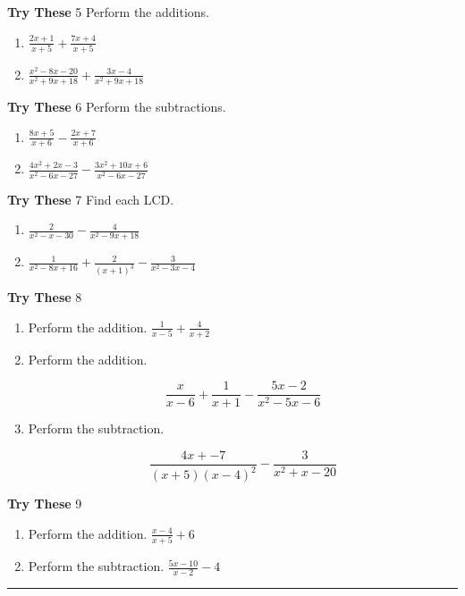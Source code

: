 \documentclass[a4paper]{JAC2003}
\begin{document}
\noindent\textcolor{red!75!black}{\textbf{Try These}} 5 Perform the additions.
\begin{enumerate}
\item $\frac{2 x+1}{x+5}+\frac{7 x+4}{x+5}$

\item $\frac{x^{2}-8 x-20}{x^{2}+9 x+18}+\frac{3 x-4}{x^{2}+9 x+18}$
\end{enumerate}

\noindent\textcolor{red!75!black}{\textbf{Try These}} 6 Perform the subtractions.
\begin{enumerate}
\item $\frac{8 x+5}{x+6}-\frac{2 x+7}{x+6}$

\item $\frac{4 x^{2}+2 x-3}{x^{2}-6 x-27}-\frac{3 x^{2}+10 x+6}{x^{2}-6 x-27}$
\end{enumerate}

\noindent\textcolor{red!75!black}{\textbf{Try These}} 7 Find each LCD.
\begin{enumerate}
\item $\frac{2}{x^{2}-x-30}-\frac{4}{x^{2}-9 x+18}$

\item $\frac{1}{x^{2}-8 x+16}+\frac{2}{(x+1)^{3}}-\frac{3}{x^{2}-3 x-4}$
\end{enumerate}

\noindent\textcolor{red!75!black}{\textbf{Try These}} 8
\begin{enumerate}
\item Perform the addition. $\frac{1}{x-5}+\frac{4}{x+2}$

\item Perform the addition.

$$
\frac{x}{x-6}+\frac{1}{x+1}-\frac{5 x-2}{x^{2}-5 x-6}
$$

\item Perform the subtraction.

$$
\frac{4 x+-7}{(x+5)(x-4)^{2}}-\frac{3}{x^{2}+x-20}
$$
\end{enumerate}

\noindent\textcolor{red!75!black}{\textbf{Try These}} 9
\begin{enumerate}
\item Perform the addition. $\frac{x-4}{x+5}+6$

\item Perform the subtraction. $\frac{5 x-10}{x-2}-4$
\end{enumerate}
\noindent\rule[0.5ex]{\linewidth}{1pt}
\end{document}
